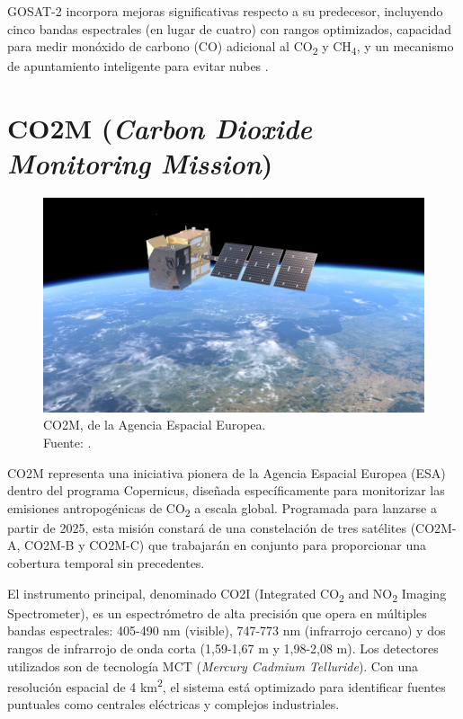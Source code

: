 GOSAT-2 incorpora mejoras significativas respecto a su predecesor, incluyendo cinco bandas espectrales (en lugar de cuatro) con rangos optimizados, capacidad para medir monóxido de carbono (CO) adicional al CO\textsubscript{2} y CH\textsubscript{4}, y un mecanismo de apuntamiento inteligente para evitar nubes \cite{jaxa_gosat} \cite{gogoi2023gosat}.

\section{CO2M (\textit{Carbon Dioxide Monitoring Mission})}

\begin{figure}[H]
    \centering
    \includegraphics[width=0.8\linewidth]{2.Misiones_Semejantes/Copernicus_Carbon_Dioxide_Monitoring_mission_article-2326145821.jpg}
    \caption{CO2M, de la Agencia Espacial Europea. \\Fuente: \cite{CO2M}.
}
\end{figure}

CO2M representa una iniciativa pionera de la Agencia Espacial Europea (ESA) dentro del programa Copernicus, diseñada específicamente para monitorizar las emisiones antropogénicas de CO\textsubscript{2} a escala global. Programada para lanzarse a partir de 2025, esta misión constará de una constelación de tres satélites (CO2M-A, CO2M-B y CO2M-C) que trabajarán en conjunto para proporcionar una cobertura temporal sin precedentes.


El instrumento principal, denominado CO2I (Integrated CO\textsubscript{2} and NO\textsubscript{2} Imaging Spectrometer), es un espectrómetro de alta precisión que opera en múltiples bandas espectrales: 405-490 nm (visible), 747-773 nm (infrarrojo cercano) y dos rangos de infrarrojo de onda corta (1,59-1,67 \textmu m y 1,98-2,08 \textmu m). Los detectores utilizados son de tecnología MCT (\textit{Mercury Cadmium Telluride}). Con una resolución espacial de 4 km\textsuperscript{2}, el sistema está optimizado para identificar fuentes puntuales como centrales eléctricas y complejos industriales.


